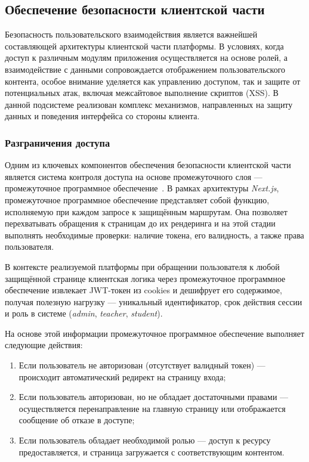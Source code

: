 \subsection{Обеспечение безопасности клиентской части}

Безопасность пользовательского взаимодействия является важнейшей составляющей архитектуры клиентской части платформы. В условиях, когда доступ к различным модулям приложения осуществляется на основе ролей, а взаимодействие с данными сопровождается отображением пользовательского контента, особое внимание уделяется как управлению доступом, так и защите от потенциальных атак, включая межсайтовое выполнение скриптов (XSS). В данной подсистеме реализован комплекс механизмов, направленных на защиту данных и поведения интерфейса со стороны клиента.

\subsubsection{Разграничения доступа}
Одним из ключевых компонентов обеспечения безопасности клиентской части является система контроля доступа на основе промежуточного слоя — промежуточное программное обеспечение~\cite{nextjs_middleware}. В рамках архитектуры \textit{Next.js}, промежуточное программное обеспечение представляет собой функцию, исполняемую при каждом запросе к защищённым маршрутам. Она позволяет перехватывать обращения к страницам до их рендеринга и на этой стадии выполнять необходимые проверки: наличие токена, его валидность, а также права пользователя.

В контексте реализуемой платформы при обращении пользователя к любой защищённой странице клиентская логика через промежуточное программное обеспечение извлекает JWT-токен из cookies и дешифрует его содержимое, получая полезную нагрузку — уникальный идентификатор, срок действия сессии и роль в системе (\textit{admin}, \textit{teacher}, \textit{student}).

На основе этой информации промежуточное программное обеспечение выполняет следующие действия:
\begin{enumerate}
  \item Если пользователь не авторизован (отсутствует валидный токен) — происходит автоматический редирект на страницу входа;
  \item Если пользователь авторизован, но не обладает достаточными правами — осуществляется перенаправление на главную страницу или отображается сообщение об отказе в доступе;
  \item Если пользователь обладает необходимой ролью — доступ к ресурсу предоставляется, и страница загружается с соответствующим контентом.
\end{enumerate}

